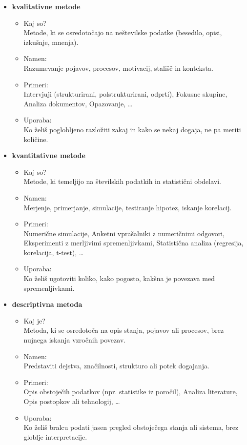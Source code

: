 \documentclass[pomnav,SMER=splošna]{fppdisp}
\begin{document}
\begin{itemize}
	\item \textbf{kvalitativne metode}
	\begin{itemize}
		\item Kaj so?\\
		Metode, ki se osredotočajo na neštevilske podatke (besedilo, opisi, izkušnje, mnenja).
		\item Namen:\\
		Razumevanje pojavov, procesov, motivacij, stališč in konteksta.
		\item Primeri:\\
		Intervjuji (strukturirani, polstrukturirani, odprti), Fokusne skupine, Analiza dokumentov, Opazovanje, \dots
		\item Uporaba:\\
		Ko želiš poglobljeno razložiti zakaj in kako se nekaj dogaja, ne pa meriti količine.
	\end{itemize}
	\item \textbf{kvantitativne metode}
	\begin{itemize}
		\item Kaj so?\\
		Metode, ki temeljijo na številskih podatkih in statistični obdelavi.
		\item Namen:\\
		Merjenje, primerjanje, simulacije, testiranje hipotez, iskanje korelacij.
		\item Primeri:\\
		Numerične simulacije, Anketni vprašalniki z numeričnimi odgovori, Eksperimenti z merljivimi spremenljivkami, Statistična analiza (regresija, korelacija, t-test), \dots
		\item Uporaba:\\
		Ko želiš ugotoviti koliko, kako pogosto, kakšna je povezava med spremenljivkami.
	\end{itemize}
	\item \textbf{descriptivna metoda}
	 \begin{itemize}
		\item Kaj je?\\
		Metoda, ki se osredotoča na opis stanja, pojavov ali procesov, brez nujnega iskanja vzročnih povezav.
		\item Namen:\\
		Predstaviti dejstva, značilnosti, strukturo ali potek dogajanja.
		\item Primeri:\\
		Opis obstoječih podatkov (npr. statistike iz poročil), Analiza literature, Opis postopkov ali tehnologij, \dots
		\item Uporaba:\\
		Ko želiš bralcu podati jasen pregled obstoječega stanja ali sistema, brez globlje interpretacije.
	\end{itemize}
\end{itemize}
\end{document}
